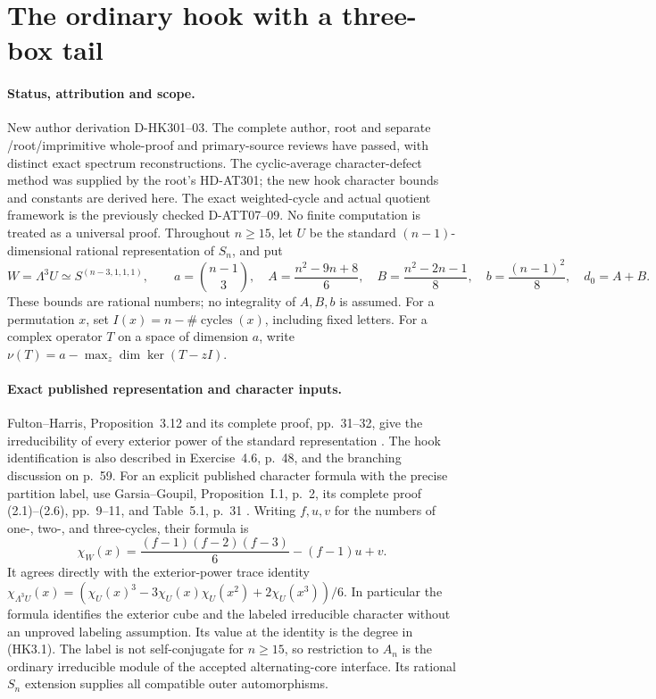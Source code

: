 \section{The ordinary hook with a three-box tail}
\label{sec:hook-three-source}

\paragraph{Status, attribution and scope.}
New author derivation D-HK301--03. The complete author, root and
separate /root/imprimitive whole-proof and primary-source reviews have
passed, with distinct exact spectrum reconstructions.  The cyclic-average character-defect method
was supplied by the root's HD-AT301; the new hook character
bounds and constants are derived here.  The exact weighted-cycle
and actual quotient framework is the previously checked
D-ATT07--09.  No finite computation is treated as a universal
proof.  Throughout $n\ge15$, let $U$ be the standard
$(n-1)$-dimensional rational representation of $S_n$, and put
\[
 W=\Lambda^3U\simeq S^{(n-3,1,1,1)},\qquad
 a=\binom{n-1}{3},\quad
 A=\frac{n^2-9n+8}{6},\quad
 B=\frac{n^2-2n-1}{8},\quad
 b=\frac{(n-1)^2}{8},\quad d_0=A+B.
 \tag{HK3.1}
\]
These bounds are rational numbers; no integrality of $A,B,b$
is assumed.  For a permutation $x$, set
$I(x)=n-\#\operatorname{cycles}(x)$, including fixed letters.
For a complex operator $T$ on a space of dimension $a$, write
$\nu(T)=a-\max_z\dim\ker(T-zI)$.

\paragraph{Exact published representation and character inputs.}
Fulton--Harris, Proposition~3.12 and its complete proof,
pp.~31--32, give the irreducibility of every exterior power
of the standard representation
\cite[Proposition~3.12, pp.~31--32]{HK:FultonHarris1991}.
The hook identification is also described in Exercise~4.6,
p.~48, and the branching discussion on p.~59.
For an explicit published character formula with the precise
partition label, use Garsia--Goupil, Proposition~I.1, p.~2,
its complete proof (2.1)--(2.6), pp.~9--11, and Table~5.1,
p.~31 \cite[Proposition~I.1; Table~5.1]{HD:GarsiaGoupil2009}.
Writing $f,u,v$ for the numbers of one-, two-, and three-cycles,
their formula is
\[
 \chi_W(x)=\frac{(f-1)(f-2)(f-3)}6-(f-1)u+v.
 \tag{HK3.2}
\]
It agrees directly with the exterior-power trace identity
$\chi_{\Lambda^3U}(x)=
(\chi_U(x)^3-3\chi_U(x)\chi_U(x^2)+2\chi_U(x^3))/6$.
In particular the formula identifies the exterior cube and
the labeled irreducible character without an unproved labeling
assumption.  Its value at the identity is the degree in (HK3.1).
The label is not self-conjugate for $n\ge15$, so restriction
to $A_n$ is the ordinary irreducible module of the accepted
alternating-core interface.  Its rational $S_n$ extension
supplies all compatible outer automorphisms.

